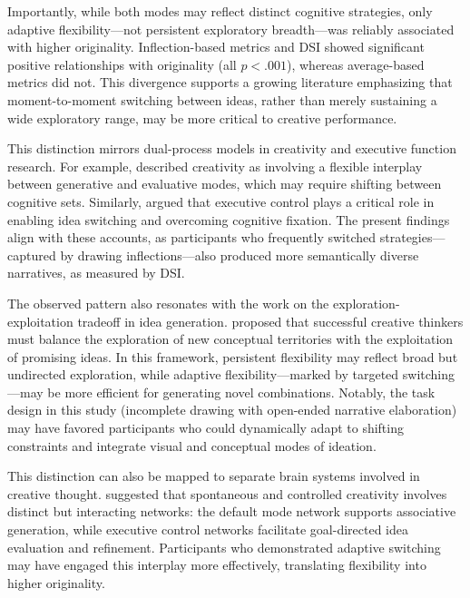 \documentclass[../MA_Thesis.tex]{subfiles}
\begin{document}
Importantly, while both modes may reflect distinct cognitive strategies, only adaptive flexibility—not persistent exploratory breadth—was reliably associated with higher originality. Inflection-based metrics and DSI showed significant positive relationships with originality (all $p < .001$), whereas average-based metrics did not. This divergence supports a growing literature emphasizing that moment-to-moment switching between ideas, rather than merely sustaining a wide exploratory range, may be more critical to creative performance.

This distinction mirrors dual-process models in creativity and executive function research. For example, \textcite{sowden_shifting_2015} described creativity as involving a flexible interplay between generative and evaluative modes, which may require shifting between cognitive sets. Similarly, \textcite{nusbaum_emily_c_and_silvia_paul_j_individual_2019} argued that executive control plays a critical role in enabling idea switching and overcoming cognitive fixation. The present findings align with these accounts, as participants who frequently switched strategies—captured by drawing inflections—also produced more semantically diverse narratives, as measured by DSI.

The observed pattern also resonates with the work on the exploration-exploitation tradeoff in idea generation. \textcite{hills_exploration_2015} proposed that successful creative thinkers must balance the exploration of new conceptual territories with the exploitation of promising ideas. In this framework, persistent flexibility may reflect broad but undirected exploration, while adaptive flexibility—marked by targeted switching—may be more efficient for generating novel combinations. Notably, the task design in this study (incomplete drawing with open-ended narrative elaboration) may have favored participants who could dynamically adapt to shifting constraints and integrate visual and conceptual modes of ideation.

This distinction can also be mapped to separate brain systems involved in creative thought. \textcite{beaty_creative_2016} suggested that spontaneous and controlled creativity involves distinct but interacting networks: the default mode network supports associative generation, while executive control networks facilitate goal-directed idea evaluation and refinement. Participants who demonstrated adaptive switching may have engaged this interplay more effectively, translating flexibility into higher originality.
\end{document}
